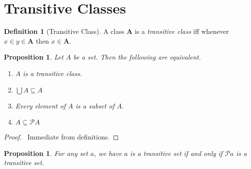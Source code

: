 \documentclass{book}
\let\qed\relax
\newtheorem{prop}[ax]{Proposition}
\theoremstyle{definition}
\newtheorem{df}[ax]{Definition}
\begin{document}
\section{Transitive Classes}

\begin{df}[Transitive Class]
A class $\mathbf{A}$ is a \emph{transitive class} iff whenever $x \in y \in \mathbf{A}$ then $x \in \mathbf{A}$.
\end{df}

\begin{prop}
\label{prop:transitiveset}
Let $A$ be a set. Then the following are equivalent.
\begin{enumerate}
\item
$A$ is a transitive class.
\item
$\bigcup A \subseteq A$
\item
Every element of $A$ is a subset of $A$.
\item
$A \subseteq \mathcal{P} A$
\end{enumerate}
\end{prop}

\begin{proof}
\pf\ Immediate from definitions. \qed
\end{proof}

\begin{prop}
For any set $a$, we have $a$ is a transitive set if and only if $\mathcal{P} a$ is a transitive set.
\end{prop}
\end{document}
